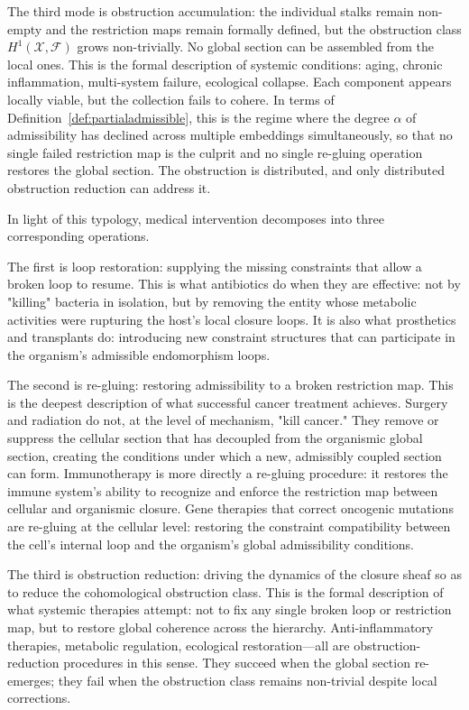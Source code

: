 \documentclass[11pt, a4paper]{article}
\theoremstyle{plain}
\theoremstyle{definition}
\theoremstyle{remark}
\begin{document}
The third mode is obstruction accumulation: the individual stalks remain non-empty and the restriction maps remain formally defined, but the obstruction class $H^1(\mathcal{X}, \mathcal{F})$ grows non-trivially. No global section can be assembled from the local ones. This is the formal description of systemic conditions: aging, chronic inflammation, multi-system failure, ecological collapse. Each component appears locally viable, but the collection fails to cohere. In terms of Definition~\ref{def:partialadmissible}, this is the regime where the degree $\alpha$ of admissibility has declined across multiple embeddings simultaneously, so that no single failed restriction map is the culprit and no single re-gluing operation restores the global section. The obstruction is distributed, and only distributed obstruction reduction can address it.

In light of this typology, medical intervention decomposes into three corresponding operations.

The first is loop restoration: supplying the missing constraints that allow a broken loop to resume. This is what antibiotics do when they are effective: not by "killing" bacteria in isolation, but by removing the entity whose metabolic activities were rupturing the host's local closure loops. It is also what prosthetics and transplants do: introducing new constraint structures that can participate in the organism's admissible endomorphism loops.

The second is re-gluing: restoring admissibility to a broken restriction map. This is the deepest description of what successful cancer treatment achieves. Surgery and radiation do not, at the level of mechanism, "kill cancer." They remove or suppress the cellular section that has decoupled from the organismic global section, creating the conditions under which a new, admissibly coupled section can form. Immunotherapy is more directly a re-gluing procedure: it restores the immune system's ability to recognize and enforce the restriction map between cellular and organismic closure. Gene therapies that correct oncogenic mutations are re-gluing at the cellular level: restoring the constraint compatibility between the cell's internal loop and the organism's global admissibility conditions.

The third is obstruction reduction: driving the dynamics of the closure sheaf so as to reduce the cohomological obstruction class. This is the formal description of what systemic therapies attempt: not to fix any single broken loop or restriction map, but to restore global coherence across the hierarchy. Anti-inflammatory therapies, metabolic regulation, ecological restoration---all are obstruction-reduction procedures in this sense. They succeed when the global section re-emerges; they fail when the obstruction class remains non-trivial despite local corrections.
\end{document}
